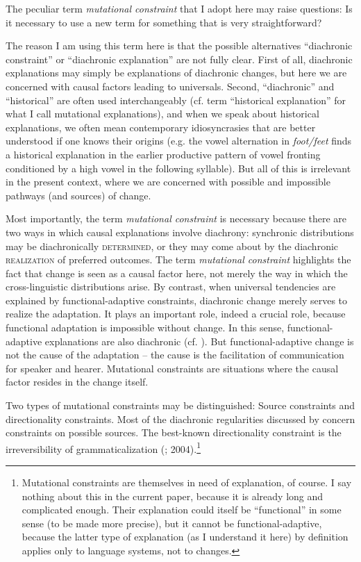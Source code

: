 \documentclass[output=paper]{langsci/langscibook}
\begin{document}
The peculiar term \textit{mutational constraint} that I adopt here may raise questions: Is it necessary to use a new term for something that is very straightforward? 

The reason I am using this term here is that the possible alternatives “diachronic constraint” or “diachronic explanation” are not fully clear. First of all, diachronic explanations may simply be explanations of diachronic changes, but here we are concerned with causal factors leading to universals. Second, “diachronic” and “historical” are often used interchangeably (cf.  term “historical explanation” for what I call mutational explanations), and when we speak about historical explanations, we often mean contemporary idiosyncrasies that are better understood if one knows their origins (e.g. the vowel alternation in \textit{foot/feet} finds a historical explanation in the earlier productive pattern of vowel fronting conditioned by a high vowel in the following syllable). But all of this is irrelevant in the present context, where we are concerned with possible and impossible pathways (and sources) of change.

Most importantly, the term \textit{mutational constraint} is necessary because there are two ways in which causal explanations involve diachrony: synchronic distributions may be diachronically \textsc{determined}, or they may come about by the diachronic \textsc{realization} of preferred outcomes. The term \textit{mutational constraint} highlights the fact that change is seen as a causal factor here, not merely the way in which the cross-linguistic distributions arise. By contrast, when universal tendencies are explained by functional-adaptive constraints, diachronic change merely serves to realize the adaptation.\label{p:haspelmath:merelyserve} 
It plays an important role, indeed a crucial role, because functional adaptation is impossible without change. In this sense, functional-adaptive explanations are also diachronic (cf. \citealt{Haspelmath1999_Opt}). But functional-adaptive change is not the cause of the adaptation – the cause is the facilitation of communication for speaker and hearer. Mutational constraints are situations where the causal factor resides in the change itself.

Two types of mutational constraints may be distinguished: Source constraints and directionality constraints. Most of the diachronic regularities discussed by \citet{Cristofaro2017} concern constraints on possible sources. The best-known directionality constraint is the irreversibility of grammaticalization (\citealt{Haspelmath1999_Irrev}; 2004).\footnote{Mutational constraints 
\label{fn:haspelmath:mutationalconstraints}
are themselves in need of explanation, of course. I say nothing about this in the current paper, because it is already long and complicated enough. Their explanation could itself be “functional” in some sense (to be made more precise), but it cannot be functional-adaptive, because the latter type of explanation (as I understand it here) by definition applies only to language systems, not to changes.} 
\end{document}
